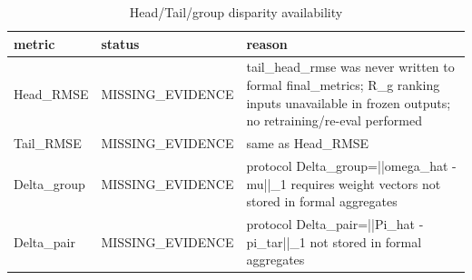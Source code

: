 \begin{table}
\caption{Head/Tail/group disparity availability}
\label{tab:table_e2e}
\begin{tabular}{lll}
\toprule
metric & status & reason \\
\midrule
Head_RMSE & MISSING_EVIDENCE & tail_head_rmse was never written to formal final_metrics; R_g ranking inputs unavailable in frozen outputs; no retraining/re-eval performed \\
Tail_RMSE & MISSING_EVIDENCE & same as Head_RMSE \\
Delta_group & MISSING_EVIDENCE & protocol Delta_group=||omega_hat - mu||_1 requires weight vectors not stored in formal aggregates \\
Delta_pair & MISSING_EVIDENCE & protocol Delta_pair=||Pi_hat - pi_tar||_1 not stored in formal aggregates \\
\bottomrule
\end{tabular}
\end{table}
